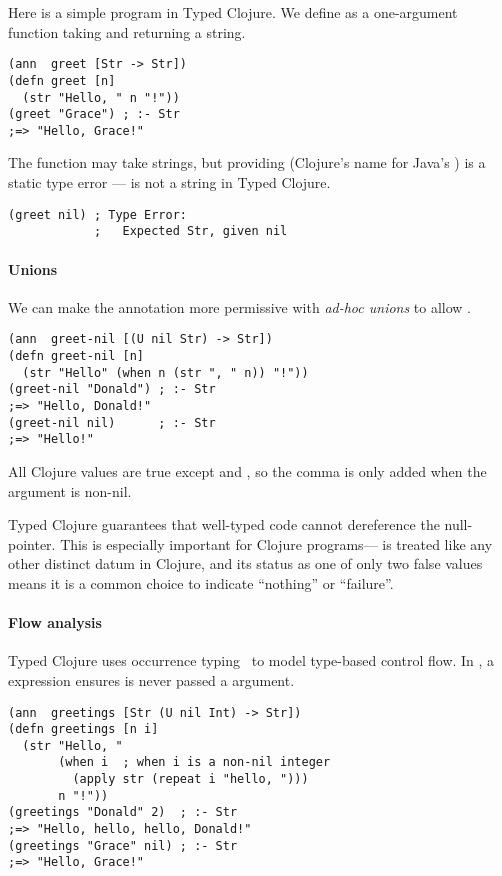Here is a simple program in Typed Clojure.
%
We define  as a one-argument function
taking and returning a string.

\begin{verbatim}
(ann  greet [Str -> Str])
(defn greet [n]
  (str "Hello, " n "!"))
(greet "Grace") ; :- Str
;=> "Hello, Grace!"
\end{verbatim}

The function may take strings, but providing  (Clojure's name for Java's )
is a static type error ---  is not a string in Typed Clojure.

\begin{verbatim}
(greet nil) ; Type Error:
            ;   Expected Str, given nil
\end{verbatim}

\paragraph{Unions} We can make the annotation more permissive with \emph{ad-hoc unions}
to allow .

\begin{verbatim}
(ann  greet-nil [(U nil Str) -> Str])
(defn greet-nil [n]
  (str "Hello" (when n (str ", " n)) "!"))
(greet-nil "Donald") ; :- Str
;=> "Hello, Donald!"
(greet-nil nil)      ; :- Str
;=> "Hello!"
\end{verbatim}

All Clojure values are true except  and , so the
comma is only added when the argument is non-nil.

Typed Clojure guarantees that well-typed code cannot
dereference the null-pointer.
This is especially important for Clojure programs---
is treated like any other distinct datum in Clojure,  and its status as
one of only two false values means it is a common choice to indicate
``nothing'' or ``failure''.

\paragraph{Flow analysis} Typed Clojure uses occurrence typing~\cite{thf10} to
model type-based control flow.
In , a  expression ensures 
is never passed a  argument.

\begin{verbatim}
(ann  greetings [Str (U nil Int) -> Str])
(defn greetings [n i]
  (str "Hello, "
       (when i  ; when i is a non-nil integer
         (apply str (repeat i "hello, ")))
       n "!"))
(greetings "Donald" 2)  ; :- Str
;=> "Hello, hello, hello, Donald!"
(greetings "Grace" nil) ; :- Str
;=> "Hello, Grace!"
\end{verbatim}

